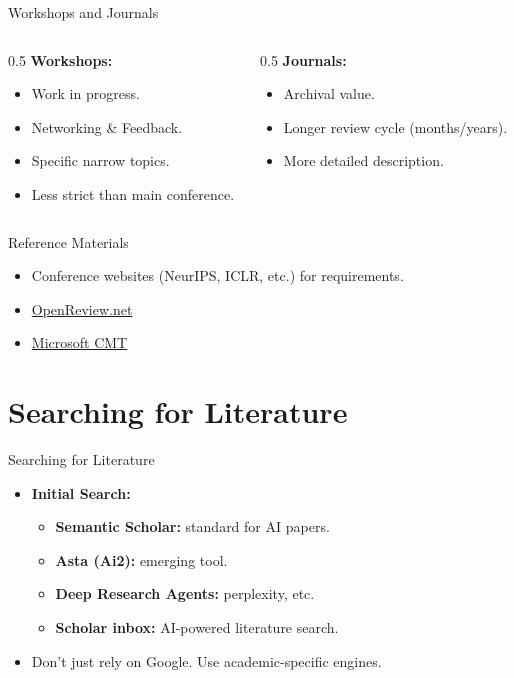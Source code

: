 \documentclass[aspectratio=169]{beamer}
\begin{document}
\begin{frame}[t]{Workshops and Journals}
    \begin{columns}
        \begin{column}{0.5\textwidth}
            \textbf{Workshops:}
            \begin{itemize}
                \item Work in progress.
                \item Networking \& Feedback.
                \item Specific narrow topics.
                \item Less strict than main conference.
            \end{itemize}
        \end{column}
        \begin{column}{0.5\textwidth}
            \textbf{Journals:}
            \begin{itemize}
                \item Archival value.
                \item Longer review cycle (months/years).
                \item More detailed description.
            \end{itemize}
        \end{column}
    \end{columns}
\end{frame}

\begin{frame}[t]{Reference Materials}
    \begin{itemize}
        \item Conference websites (NeurIPS, ICLR, etc.) for requirements.
        \item \href{https://openreview.net/}{OpenReview.net}
        \item \href{https://cmt3.research.microsoft.com/}{Microsoft CMT}
    \end{itemize}
\end{frame}


\section{Searching for Literature}

\begin{frame}[t]{Searching for Literature}
    \begin{itemize}
        \item \textbf{Initial Search:}
        \begin{itemize}
            \item \textbf{Semantic Scholar:} standard for AI papers.
            \item \textbf{Asta (Ai2):} emerging tool.
            \item \textbf{Deep Research Agents:} perplexity, etc.
            \item \textbf{Scholar inbox:} AI-powered literature search.
        \end{itemize}
        \item Don't just rely on Google. Use academic-specific engines.
    \end{itemize}
\end{frame}
\end{document}
